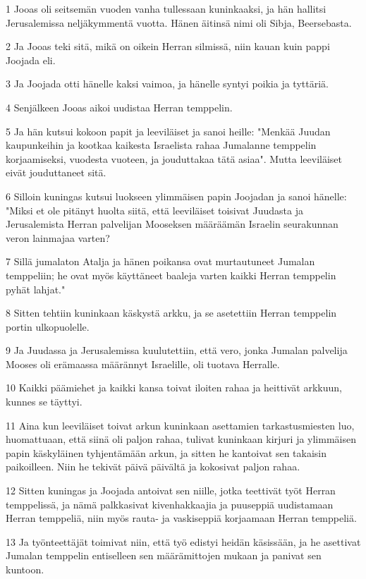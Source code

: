 \par 1 Jooas oli seitsemän vuoden vanha tullessaan kuninkaaksi, ja hän hallitsi Jerusalemissa neljäkymmentä vuotta. Hänen äitinsä nimi oli Sibja, Beersebasta.
\par 2 Ja Jooas teki sitä, mikä on oikein Herran silmissä, niin kauan kuin pappi Joojada eli.
\par 3 Ja Joojada otti hänelle kaksi vaimoa, ja hänelle syntyi poikia ja tyttäriä.
\par 4 Senjälkeen Jooas aikoi uudistaa Herran temppelin.
\par 5 Ja hän kutsui kokoon papit ja leeviläiset ja sanoi heille: "Menkää Juudan kaupunkeihin ja kootkaa kaikesta Israelista rahaa Jumalanne temppelin korjaamiseksi, vuodesta vuoteen, ja jouduttakaa tätä asiaa". Mutta leeviläiset eivät jouduttaneet sitä.
\par 6 Silloin kuningas kutsui luokseen ylimmäisen papin Joojadan ja sanoi hänelle: "Miksi et ole pitänyt huolta siitä, että leeviläiset toisivat Juudasta ja Jerusalemista Herran palvelijan Mooseksen määräämän Israelin seurakunnan veron lainmajaa varten?
\par 7 Sillä jumalaton Atalja ja hänen poikansa ovat murtautuneet Jumalan temppeliin; he ovat myös käyttäneet baaleja varten kaikki Herran temppelin pyhät lahjat."
\par 8 Sitten tehtiin kuninkaan käskystä arkku, ja se asetettiin Herran temppelin portin ulkopuolelle.
\par 9 Ja Juudassa ja Jerusalemissa kuulutettiin, että vero, jonka Jumalan palvelija Mooses oli erämaassa määrännyt Israelille, oli tuotava Herralle.
\par 10 Kaikki päämiehet ja kaikki kansa toivat iloiten rahaa ja heittivät arkkuun, kunnes se täyttyi.
\par 11 Aina kun leeviläiset toivat arkun kuninkaan asettamien tarkastusmiesten luo, huomattuaan, että siinä oli paljon rahaa, tulivat kuninkaan kirjuri ja ylimmäisen papin käskyläinen tyhjentämään arkun, ja sitten he kantoivat sen takaisin paikoilleen. Niin he tekivät päivä päivältä ja kokosivat paljon rahaa.
\par 12 Sitten kuningas ja Joojada antoivat sen niille, jotka teettivät työt Herran temppelissä, ja nämä palkkasivat kivenhakkaajia ja puuseppiä uudistamaan Herran temppeliä, niin myös rauta- ja vaskiseppiä korjaamaan Herran temppeliä.
\par 13 Ja työnteettäjät toimivat niin, että työ edistyi heidän käsissään, ja he asettivat Jumalan temppelin entiselleen sen määrämittojen mukaan ja panivat sen kuntoon.
